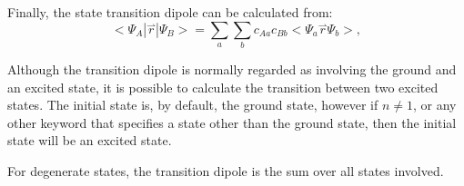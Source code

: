 Finally, the state transition dipole can be calculated from:
$$
<\! \Psi_A|\stackrel{\rightharpoonup}{r}|\Psi_B\! > =\sum_a\sum_bc_{A a}c_{B b}<\! \Psi_a\stackrel{\rightharpoonup}{r}\Psi_b \!>,
$$

Although the transition dipole is normally regarded as involving the ground and an excited state, it is
possible to calculate the transition between two excited states.  The initial state is, by default, the
ground state, however if  $n\neq 1$, or any other keyword that specifies
a state other than the ground state, then the initial state will be an excited state.

For degenerate states, the transition dipole is the sum over all states involved.
